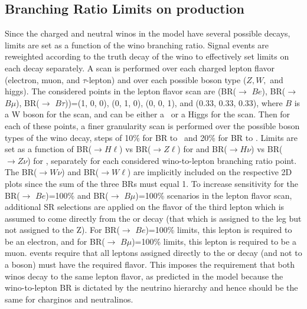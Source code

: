 \subsection{Branching Ratio Limits on \BL production}
\label{sec:BRscan}
Since the charged and neutral winos in the \BL model have several possible decays, limits are set as a function of the wino branching ratio. 
Signal events are reweighted according to the truth decay of the wino to effectively set limits on each decay separately.
A scan is performed over each charged lepton flavor (electron, muon, and $\tau$-lepton) and over each possible boson type (\(Z,W,\) and higgs). 
The considered points in the lepton flavor scan are (BR(\wino$\rightarrow$ \(Be\)), BR(\wino$\rightarrow$ \(B\mu\)), BR(\wino$\rightarrow$ \(B\tau\)))=(1, 0, 0), (0, 1, 0), (0, 0, 1), and (0.33, 0.33, 0.33), where \(B\) is a W boson for the \none scan, and can be either a \Zboson\ or a Higgs for the \chone scan.
Then for each of these points, a finer granularity scan is performed over the possible boson types of the wino decay, steps of 10\% for BR to \Zboson\ and 20\% for BR to \Hboson. 
Limits are set as a function of BR(\chone$\rightarrow H\ell$) vs BR(\chone$\rightarrow Z\ell$) for \chone and BR(\none $\rightarrow H\nu$) vs BR(\none$\rightarrow Z\nu$) for \none, separately for each considered wino-to-lepton branching ratio point.
The BR(\chone$\rightarrow W\nu$) and  BR(\none$\rightarrow W\ell$) are implicitly included on the respective 2D plots since the sum of the three BRs must equal 1.
To increase sensitivity for the BR(\wino$\rightarrow$ \(Be\))=100\% and BR(\wino$\rightarrow$ \(B\mu\))=100\% scenarios in the lepton flavor scan, additional SR selections are applied on the flavor of the third lepton which is assumed to come directly from the \chone or \none decay (that which is assigned to the \Zl leg but not assigned to the Z). 
For BR(\wino$\rightarrow$ \(Be\))=100\% limits, this lepton is required to be an electron, and for BR(\wino$\rightarrow$ \(B\mu\))=100\% limits, this lepton is required to be a muon.
\SRFR events require that all leptons assigned directly to the \chone or \none decay (and not to a boson) must have the required flavor.
This imposes the requirement that both winos decay to the same lepton flavor, as predicted in the \BL model because the wino-to-lepton BR is dictated by the neutrino hierarchy and hence should be the same for charginos and neutralinos.
